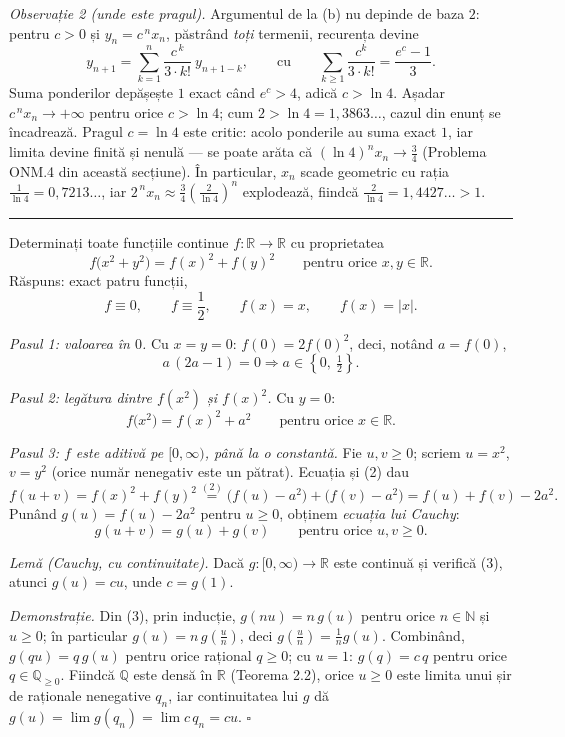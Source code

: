 \emph{Observație 2 (unde este pragul).} Argumentul de la (b) nu depinde de baza $2$: pentru $c>0$ și $y_n=c^{\,n}x_n$, păstrând \emph{toți} termenii, recurența devine
\[ y_{n+1}=\sum_{k=1}^{n}\frac{c^{\,k}}{3\cdot k!}\ y_{n+1-k},\qquad\text{cu}\qquad \sum_{k\ge1}\frac{c^{k}}{3\cdot k!}=\frac{e^{c}-1}{3} . \]
Suma ponderilor depășește $1$ exact când $e^{c}>4$, adică $c>\ln4$. Așadar $c^{\,n}x_n\to+\infty$ pentru orice $c>\ln4$; cum $2>\ln4=1{,}3863\dots$, cazul din enunț se încadrează. Pragul $c=\ln4$ este critic: acolo ponderile au suma exact $1$, iar limita devine finită și nenulă --- se poate arăta că $(\ln4)^n x_n\to\frac34$ (Problema ONM.4 din această secțiune). În particular, $x_n$ scade geometric cu rația $\frac1{\ln4}=0{,}7213\dots$, iar $2^{\,n}x_n\approx\frac34\left(\frac{2}{\ln4}\right)^{\!n}$ explodează, fiindcă $\frac{2}{\ln4}=1{,}4427\dots>1$.
\vspace{1mm}\hrule

Determinați toate funcțiile continue $f:\mathbb{R}\to\mathbb{R}$ cu proprietatea
\[ f\bigl(x^{2}+y^{2}\bigr)=f(x)^{2}+f(y)^{2}\qquad\text{pentru orice }x,y\in\mathbb{R}. \]
\sol Răspuns: exact patru funcții,
\[ f\equiv0,\qquad f\equiv\frac12,\qquad f(x)=x,\qquad f(x)=|x| . \]

\emph{Pasul 1: valoarea în $0$.} Cu $x=y=0$: $f(0)=2f(0)^{2}$, deci, notând $a=f(0)$,
\[ a\,(2a-1)=0 \Longrightarrow a\in\left\{0,\ \tfrac12\right\} . \tag{1} \]

\emph{Pasul 2: legătura dintre $f(x^{2})$ și $f(x)^{2}$.} Cu $y=0$:
\[ f\bigl(x^{2}\bigr)=f(x)^{2}+a^{2}\qquad\text{pentru orice }x\in\mathbb{R}. \tag{2} \]

\emph{Pasul 3: $f$ este aditivă pe $[0,\infty)$, până la o constantă.} Fie $u,v\ge0$; scriem $u=x^{2}$, $v=y^{2}$ (orice număr nenegativ este un pătrat). Ecuația și (2) dau
\[ f(u+v)=f(x)^{2}+f(y)^{2}\overset{(2)}{=}\bigl(f(u)-a^{2}\bigr)+\bigl(f(v)-a^{2}\bigr)=f(u)+f(v)-2a^{2} . \]
Punând $g(u)=f(u)-2a^{2}$ pentru $u\ge0$, obținem \emph{ecuația lui Cauchy}:
\[ g(u+v)=g(u)+g(v)\qquad\text{pentru orice }u,v\ge0 . \tag{3} \]

\emph{Lemă (Cauchy, cu continuitate).} Dacă $g:[0,\infty)\to\mathbb{R}$ este continuă și verifică (3), atunci $g(u)=cu$, unde $c=g(1)$.

\emph{Demonstrație.} Din (3), prin inducție, $g(nu)=n\,g(u)$ pentru orice $n\in\mathbb{N}$ și $u\ge0$; în particular $g(u)=n\,g\!\left(\frac un\right)$, deci $g\!\left(\frac un\right)=\frac1n g(u)$. Combinând, $g(qu)=q\,g(u)$ pentru orice rațional $q\ge0$; cu $u=1$: $g(q)=c\,q$ pentru orice $q\in\mathbb{Q}_{\ge0}$. Fiindcă $\mathbb{Q}$ este densă în $\mathbb{R}$ (Teorema 2.2), orice $u\ge0$ este limita unui șir de raționale nenegative $q_n$, iar continuitatea lui $g$ dă $g(u)=\lim g(q_n)=\lim c\,q_n=cu$. $\square$

